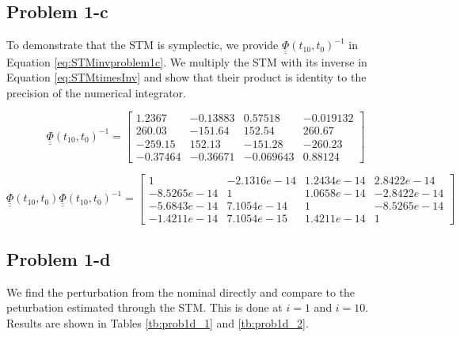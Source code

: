 \documentclass[11pt]{article}
\begin{document}
\subsection{Problem 1-c}

To demonstrate that the STM is symplectic, we provide $\underline{\underline{\Phi}}(t_{10}, t_0)^{-1}$ in Equation \eqref{eq:STMinvproblem1c}. We multiply the STM with its inverse in Equation \eqref{eq:STMtimesInv} and show that their product is identity to the precision of the numerical integrator.

\begin{equation}
	\label{eq:STMinvproblem1c}
	\underline{\underline{\Phi}}(t_{10}, t_0)^{-1} = \begin{bmatrix}
		1.2367 & -0.13883 & 0.57518 & -0.019132 \\
		260.03 & -151.64 & 152.54 & 260.67 \\
		-259.15 & 152.13 & -151.28 & -260.23 \\
		-0.37464 & -0.36671 & -0.069643 & 0.88124
	\end{bmatrix}
\end{equation}

\begin{equation}
	\label{eq:STMtimesInv}
	\underline{\underline{\Phi}}(t_{10}, t_0) \underline{\underline{\Phi}}(t_{10}, t_0)^{-1} = \begin{bmatrix}
		1 & -2.1316e-14 & 1.2434e-14 & 2.8422e-14 \\
		-8.5265e-14 & 1 & 1.0658e-14 & -2.8422e-14 \\
		-5.6843e-14 & 7.1054e-14 & 1 & -8.5265e-14 \\
		-1.4211e-14 & 7.1054e-15 & 1.4211e-14 & 1
	\end{bmatrix}
\end{equation}

\subsection{Problem 1-d}

We find the perturbation from the nominal directly and compare to the peturbation estimated through the STM. This is done at $i=1$ and $i=10$. Results are shown in Tables \ref{tb:prob1d_1} and \ref{tb:prob1d_2}. \\
\end{document}
